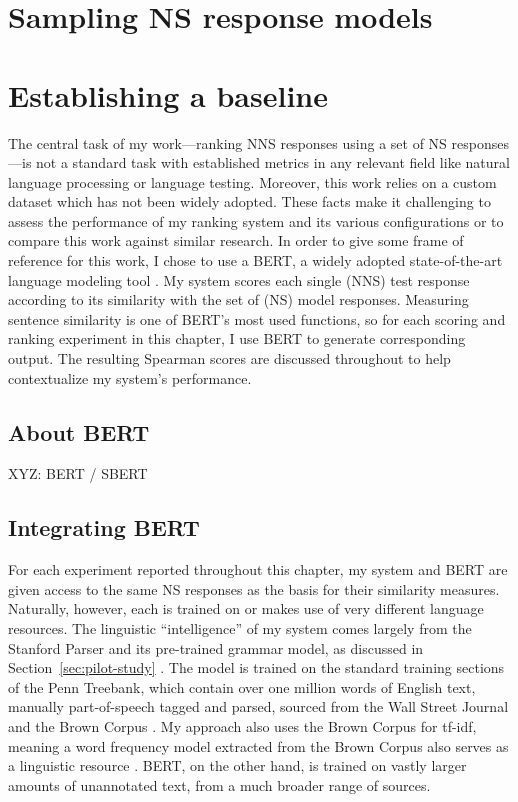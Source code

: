 \section{Sampling NS response models}
\label{sec:sampling}

\section{Establishing a baseline}
\label{sec:bert-baseline}
The central task of my work---ranking NNS responses using a set of NS responses---is not a standard task with established metrics in any relevant field like natural language processing or language testing. Moreover, this work relies on a custom dataset which has not been widely adopted. These facts make it challenging to assess the performance of my ranking system and its various configurations or to compare this work against similar research. In order to give some frame of reference for this work, I chose to use a BERT, a widely adopted state-of-the-art language modeling tool \cite{BertDevlin2018}. My system scores each single (NNS) test response according to its similarity with the set of (NS) model responses. Measuring sentence similarity is one of BERT's most used functions, so for each scoring and ranking experiment in this chapter, I use BERT to generate corresponding output. The resulting Spearman scores are discussed throughout to help contextualize my system's performance.
\subsection{About BERT}
\label{sec:about-bert}
XYZ: BERT / SBERT

\subsection{Integrating BERT}

For each experiment reported throughout this chapter, my system and BERT are given access to the same NS responses as the basis for their similarity measures. Naturally, however, each is trained on or makes use of very different language resources. The linguistic ``intelligence'' of my system comes largely from the Stanford Parser and its pre-trained grammar model, as discussed in Section~\ref{sec:pilot-study} \cite{klein:manning:03}. The model is trained on the standard training sections of the Penn Treebank, which contain over one million words of English text, manually part-of-speech tagged and parsed, sourced from the Wall Street Journal and the Brown Corpus \cite{marcus-et-al:93}. My approach also uses the Brown Corpus for tf-idf, meaning a word frequency model extracted from the Brown Corpus also serves as a linguistic resource \cite{kucera:francis:67}. BERT, on the other hand, is trained on vastly larger amounts of unannotated text, from a much broader range of sources.

